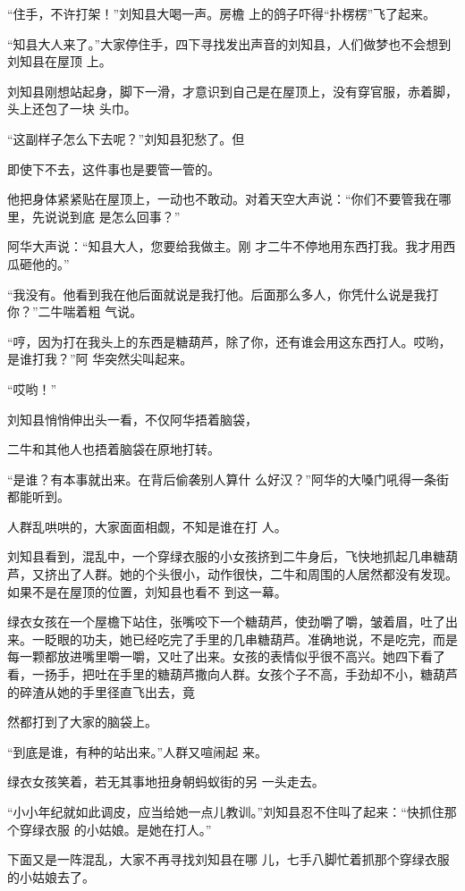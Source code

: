 \documentclass{article}
\begin{document}
“住手，不许打架！”刘知县大喝一声。房檐
上的鸽子吓得“扑楞楞”飞了起来。 

“知县大人来了。”大家停住手，四下寻找发出声音的刘知县，人们做梦也不会想到刘知县在屋顶
上。 

刘知县刚想站起身，脚下一滑，才意识到自己是在屋顶上，没有穿官服，赤着脚，头上还包了一块
头巾。 

“这副样子怎么下去呢？”刘知县犯愁了。但

\newpage
即使下不去，这件事也是要管一管的。 

他把身体紧紧贴在屋顶上，一动也不敢动。对着天空大声说：“你们不要管我在哪里，先说说到底
是怎么回事？” 

阿华大声说：“知县大人，您要给我做主。刚
才二牛不停地用东西打我。我才用西瓜砸他的。” 

“我没有。他看到我在他后面就说是我打他。后面那么多人，你凭什么说是我打你？”二牛喘着粗
气说。 

“哼，因为打在我头上的东西是糖葫芦，除了你，还有谁会用这东西打人。哎哟，是谁打我？”阿
华突然尖叫起来。 


“哎哟！” 


刘知县悄悄伸出头一看，不仅阿华捂着脑袋，

\newpage
二牛和其他人也捂着脑袋在原地打转。 

“是谁？有本事就出来。在背后偷袭别人算什
么好汉？”阿华的大嗓门吼得一条街都能听到。 

人群乱哄哄的，大家面面相觑，不知是谁在打
人。 

刘知县看到，混乱中，一个穿绿衣服的小女孩挤到二牛身后，飞快地抓起几串糖葫芦，又挤出了人群。她的个头很小，动作很快，二牛和周围的人居然都没有发现。如果不是在屋顶的位置，刘知县也看不
到这一幕。 

绿衣女孩在一个屋檐下站住，张嘴咬下一个糖葫芦，使劲嚼了嚼，皱着眉，吐了出来。一眨眼的功夫，她已经吃完了手里的几串糖葫芦。准确地说，不是吃完，而是每一颗都放进嘴里嚼一嚼，又吐了出来。女孩的表情似乎很不高兴。她四下看了看，一扬手，把吐在手里的糖葫芦撒向人群。女孩个子不高，手劲却不小，糖葫芦的碎渣从她的手里径直飞出去，竟

\newpage
然都打到了大家的脑袋上。 



“到底是谁，有种的站出来。”人群又喧闹起
来。 

绿衣女孩笑着，若无其事地扭身朝蚂蚁街的另
一头走去。 

“小小年纪就如此调皮，应当给她一点儿教训。”刘知县忍不住叫了起来：“快抓住那个穿绿衣服
的小姑娘。是她在打人。” 

下面又是一阵混乱，大家不再寻找刘知县在哪
儿，七手八脚忙着抓那个穿绿衣服的小姑娘去了。 
\end{document}
